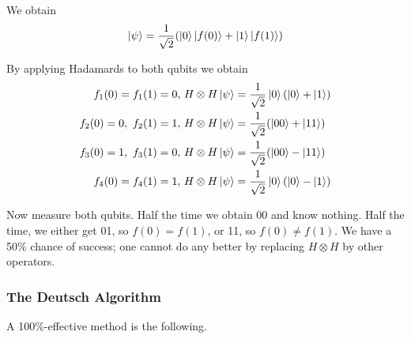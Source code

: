 \begin{figure}[H]
    \centering
\end{figure}

We obtain
\begin{align*}
    \ket{\psi}=\frac{1}{\sqrt{2}}(\ket{0}\ket{f(0)}+\ket{1}\ket{f(1)})
\end{align*}

By applying Hadamards to both qubits we obtain
\begin{align*}
    f_1(0)=f_1(1)=0,\ &H\otimes H\ket{\psi}=\frac{1}{\sqrt{2}}\ket{0}(\ket{0}+\ket{1})\\
    f_2(0)=0,\ f_2(1)=1,\ &H\otimes H\ket{\psi}=\frac{1}{\sqrt{2}}(\ket{00}+\ket{11})\\
    f_3(0)=1,\ f_3(1)=0,\ &H\otimes H\ket{\psi}=\frac{1}{\sqrt{2}}(\ket{00}-\ket{11})\\
    f_4(0)=f_4(1)=1,\ &H\otimes H\ket{\psi}=\frac{1}{\sqrt{2}}\ket{0}(\ket{0}-\ket{1})
\end{align*}

Now measure both qubits. Half the time we obtain 00 and know nothing. Half the time, we either get 01, so $f (0) = f (1)$, or 11, so $f (0) \ne f (1)$. We have a 50\% chance of success; one cannot do any better by replacing $H \otimes H$ by other operators.

\subsubsection{The Deutsch Algorithm}
A 100\%-effective method is the following.

